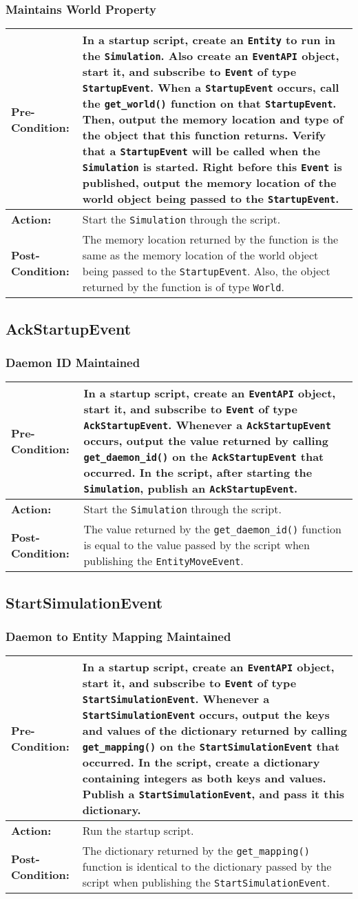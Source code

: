 \documentclass[titlepage]{article}
\newcommand{\testcase}[3]{
    \begin{center}
    \begin{tabular}{| l | p{0.7\textwidth}|}
        \hline
        \rowcolor[gray]{0.8}\textbf{Pre-Condition:} & #1 \\ \hline
        \textbf{Action:} & #2 \\ \hline
        \rowcolor[gray]{0.8}\textbf{Post-Condition:} & #3 \\ \hline
    \end{tabular}
    \end{center}
}
\begin{document}
\subsubsection{Maintains World Property}
\testcase{In a startup script, create an \texttt{Entity} to run in the \texttt{Simulation}. Also create an \texttt{EventAPI} object, start it, and subscribe to \texttt{Event} of type \texttt{StartupEvent}. When a \texttt{StartupEvent} occurs, call the \texttt{get\_world()} function on that \texttt{StartupEvent}. Then, output the memory location and type of the object that this function returns.  Verify that a \texttt{StartupEvent} will be called when the \texttt{Simulation} is started. Right before this \texttt{Event} is published, output the memory location of the world object being passed to the \texttt{StartupEvent}.}{Start the \texttt{Simulation} through the script.}{The memory location returned by the function is the same as the memory location of the world object being passed to the \texttt{StartupEvent}. Also, the object returned by the function is of type \texttt{World}.}

\subsection{AckStartupEvent}
\subsubsection{Daemon ID Maintained}
\testcase{In a startup script, create an \texttt{EventAPI} object, start it, and subscribe to \texttt{Event} of type \texttt{AckStartupEvent}. Whenever a \texttt{AckStartupEvent} occurs, output the value returned by calling \texttt{get\_daemon\_id()} on the \texttt{AckStartupEvent} that occurred. In the script, after starting the \texttt{Simulation}, publish an \texttt{AckStartupEvent}.}{Start the \texttt{Simulation} through the script.}{The value returned by the \texttt{get\_daemon\_id()} function is equal to the value passed by the script when publishing the \texttt{EntityMoveEvent}.}

\subsection{StartSimulationEvent}
\subsubsection{Daemon to Entity Mapping Maintained}
\testcase{In a startup script, create an \texttt{EventAPI} object, start it, and subscribe to \texttt{Event} of type \texttt{StartSimulationEvent}. Whenever a \texttt{StartSimulationEvent} occurs, output the keys and values of the dictionary returned by calling \texttt{get\_mapping()} on the \texttt{StartSimulationEvent} that occurred. In the script, create a dictionary containing integers as both keys and values. Publish a \texttt{StartSimulationEvent}, and pass it this dictionary.}{Run the startup script.}{The dictionary returned by the \texttt{get\_mapping()} function is identical to the dictionary passed by the script when publishing the \texttt{StartSimulationEvent}.}
\end{document}
